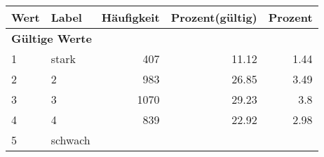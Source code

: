      \begin{longtable}{lXrrr}
     \toprule
     \textbf{Wert} & \textbf{Label} & \textbf{Häufigkeit} & \textbf{Prozent(gültig)} & \textbf{Prozent} \\
     \endhead
     \midrule
     \multicolumn{5}{l}{\textbf{Gültige Werte}}\\

     1 &
     \multicolumn{1}{X}{ stark   } &


       \num{407} &
       \num[round-mode=places,round-precision=2]{11,12} &
         \num[round-mode=places,round-precision=2]{1,44} \\

     2 &
     \multicolumn{1}{X}{ 2   } &


       \num{983} &
       \num[round-mode=places,round-precision=2]{26,85} &
         \num[round-mode=places,round-precision=2]{3,49} \\

     3 &
     \multicolumn{1}{X}{ 3   } &


       \num{1070} &
       \num[round-mode=places,round-precision=2]{29,23} &
         \num[round-mode=places,round-precision=2]{3,8} \\

     4 &
     \multicolumn{1}{X}{ 4   } &


       \num{839} &
       \num[round-mode=places,round-precision=2]{22,92} &
         \num[round-mode=places,round-precision=2]{2,98} \\

     5 &
     \multicolumn{1}{X}{ schwach   } &



\end{longtable}
